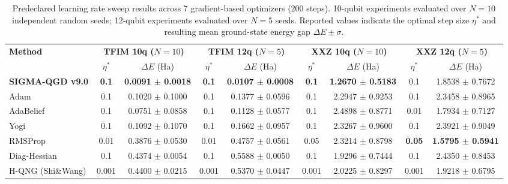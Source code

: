\begin{table}[htbp]
\centering
\small
\caption{Predeclared learning rate sweep results across 7 gradient-based optimizers ($200$ steps). 10-qubit experiments evaluated over $N=10$ independent random seeds; 12-qubit experiments evaluated over $N=5$ seeds. Reported values indicate the optimal step size $\eta^*$ and resulting mean ground-state energy gap $\Delta E \pm \sigma$.}
\label{tab:lr_sweep_summary}
\begin{tabular}{lcccccccc}
\toprule
\multirow{2}{*}{\textbf{Method}} & \multicolumn{2}{c}{\textbf{TFIM 10q ($N=10$)}} & \multicolumn{2}{c}{\textbf{TFIM 12q ($N=5$)}} & \multicolumn{2}{c}{\textbf{XXZ 10q ($N=10$)}} & \multicolumn{2}{c}{\textbf{XXZ 12q ($N=5$)}} \\
\cmidrule(lr){2-3} \cmidrule(lr){4-5} \cmidrule(lr){6-7} \cmidrule(lr){8-9}
& $\eta^*$ & $\Delta E$ (Ha) & $\eta^*$ & $\Delta E$ (Ha) & $\eta^*$ & $\Delta E$ (Ha) & $\eta^*$ & $\Delta E$ (Ha) \\
\midrule
\textbf{SIGMA-QGD v9.0} & \textbf{0.1} & \textbf{0.0091 $\pm$ 0.0018} & \textbf{0.1} & \textbf{0.0107 $\pm$ 0.0008} & \textbf{0.1} & \textbf{1.2670 $\pm$ 0.5183} & 0.1 & 1.8538 $\pm$ 0.7672 \\
Adam & 0.1 & 0.1020 $\pm$ 0.1000 & 0.1 & 0.1377 $\pm$ 0.0596 & 0.1 & 2.2947 $\pm$ 0.9253 & 0.1 & 2.3458 $\pm$ 0.8965 \\
AdaBelief & 0.1 & 0.0751 $\pm$ 0.0858 & 0.1 & 0.1128 $\pm$ 0.0577 & 0.1 & 2.4898 $\pm$ 0.8771 & 0.01 & 1.7934 $\pm$ 0.7127 \\
Yogi & 0.1 & 0.1092 $\pm$ 0.1070 & 0.1 & 0.1662 $\pm$ 0.0957 & 0.1 & 2.3267 $\pm$ 0.9600 & 0.1 & 2.3921 $\pm$ 0.9049 \\
RMSProp & 0.01 & 0.3876 $\pm$ 0.0530 & 0.01 & 0.4757 $\pm$ 0.0561 & 0.05 & 2.3214 $\pm$ 0.8798 & \textbf{0.05} & \textbf{1.5795 $\pm$ 0.5941} \\
Diag-Hessian & 0.1 & 0.4374 $\pm$ 0.0054 & 0.1 & 0.5588 $\pm$ 0.0050 & 0.1 & 1.9296 $\pm$ 0.7444 & 0.1 & 2.4350 $\pm$ 0.8453 \\
H-QNG (Shi\&Wang) & 0.001 & 0.4400 $\pm$ 0.0215 & 0.001 & 0.5370 $\pm$ 0.0447 & 0.001 & 2.0225 $\pm$ 0.8297 & 0.001 & 1.9218 $\pm$ 0.6795 \\
\bottomrule
\end{tabular}
\end{table}
